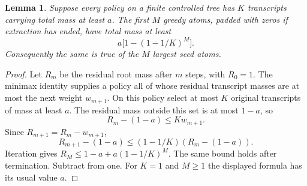 \documentclass[11pt]{article}
\newtheorem{lemma}[theorem]{Lemma}
\begin{document}
\begin{lemma}\label{lem:concentration}
Suppose every policy on a finite controlled tree has $K$ transcripts
carrying total mass at least $a$. The first $M$ greedy atoms, padded with
zeros if extraction has ended, have total mass at least
\[
 a\bigl[1-(1-1/K)^M\bigr].\label{eq:head}
\]
Consequently the same is true of the $M$ largest seed atoms.
\end{lemma}
\begin{proof}
Let $R_m$ be the residual root mass after $m$ steps, with $R_0=1$.
The minimax identity supplies a policy all of whose residual transcript
masses are at most the next weight $w_{m+1}$. On this policy select at
most $K$ original transcripts of mass at least $a$. The residual mass
outside this set is at most $1-a$, so
\[
 R_m-(1-a)\le K w_{m+1}.
\]
Since $R_{m+1}=R_m-w_{m+1}$,
\[
 R_{m+1}-(1-a)\le(1-1/K)(R_m-(1-a)).
\]
Iteration gives $R_M\le1-a+a(1-1/K)^M$. The same bound holds after
termination. Subtract from one. For $K=1$ and $M\ge1$ the displayed
formula has its usual value $a$.
\end{proof}
\end{document}
